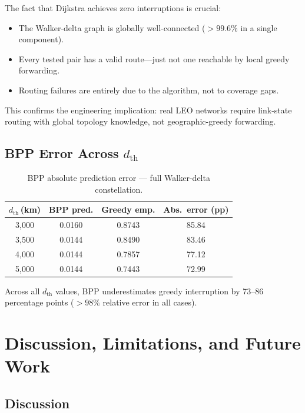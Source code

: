 \documentclass[12pt,a4paper]{report}
\newcommand{\dth}{d_{\mathrm{th}}}
\begin{document}
The fact that Dijkstra achieves zero interruptions is crucial:

\begin{itemize}
  \item The Walker-delta graph is globally well-connected ($>99.6\%$ in a single component).
  \item Every tested pair has a valid route---just not one reachable by local greedy forwarding.
  \item Routing failures are entirely due to the algorithm, not to coverage gaps.
\end{itemize}

This confirms the engineering implication: real LEO networks require link-state routing
with global topology knowledge, not geographic-greedy forwarding.

\section{BPP Error Across \texorpdfstring{$d_\mathrm{th}$}{d\_th}}

\begin{table}[H]
\centering
\caption{BPP absolute prediction error — full Walker-delta constellation.}
\label{tab:bpperr}
\begin{tabular}{cccc}
\toprule
$d_\mathrm{th}$\,(km) & \textbf{BPP pred.} & \textbf{Greedy emp.} & \textbf{Abs.\ error (pp)} \\
\midrule
3{,}000 & 0.0160 & 0.8743 & 85.84 \\
3{,}500 & 0.0144 & 0.8490 & 83.46 \\
4{,}000 & 0.0144 & 0.7857 & 77.12 \\
5{,}000 & 0.0144 & 0.7443 & 72.99 \\
\bottomrule
\end{tabular}
\end{table}

Across all $\dth$ values, BPP underestimates greedy interruption by 73--86 percentage
points ($>98\%$ relative error in all cases).

\chapter{Discussion, Limitations, and Future Work}
\label{ch:discussion}

\section{Discussion}
\end{document}
